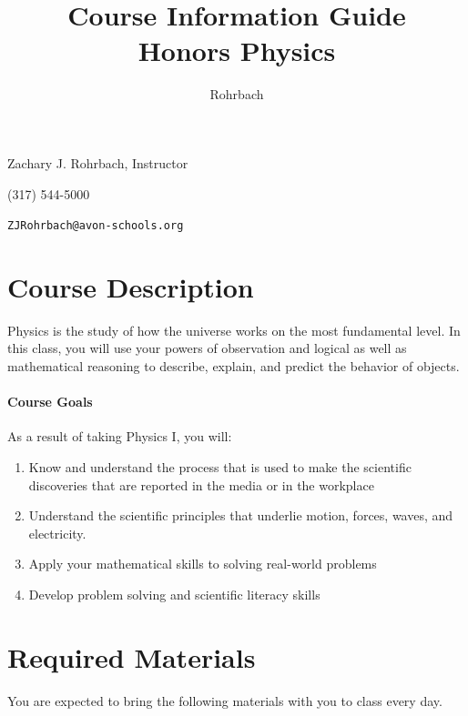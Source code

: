 \documentclass[10pt]{exam}
\title{Course Information Guide \\ Honors Physics}
\author{Rohrbach}
\begin{document}
\maketitle

\noindent Zachary J. Rohrbach, Instructor

\noindent (317) 544-5000

\noindent \texttt{ZJRohrbach@avon-schools.org}

\section*{Course Description}

Physics is the study of how the universe works on the most fundamental level.  In this 
class, you will use your powers of observation and logical as well as mathematical 
reasoning to describe, explain, and predict the behavior of objects.

\paragraph{Course Goals} 
As a result of taking Physics I, you will:

\begin{enumerate}
	\item Know and understand the process that is used to make the scientific discoveries that 
				are reported in the media or in the workplace
	\item Understand the scientific principles that underlie motion, forces, waves, and electricity.
	\item Apply your mathematical skills to solving real-world problems
	\item Develop problem solving and scientific literacy skills
\end{enumerate}


\section*{Required Materials}

You are expected to bring the following materials with you to class every day.  
\end{document}
